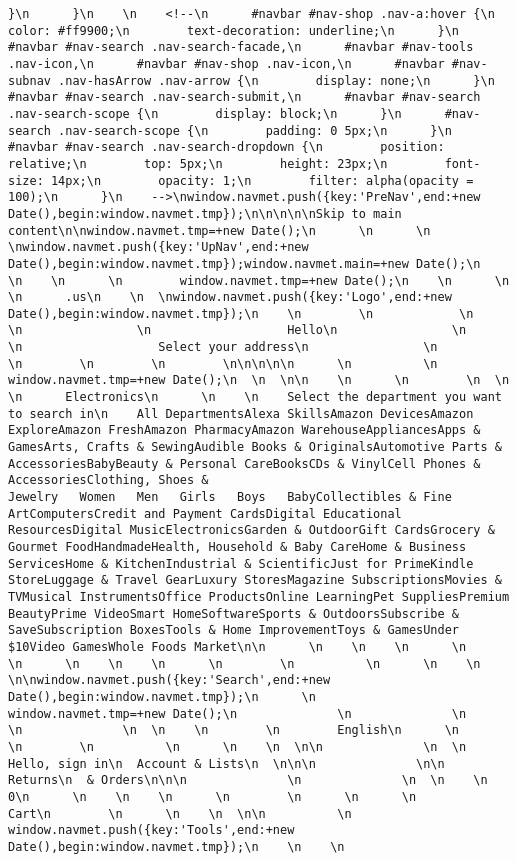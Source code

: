 \documentclass[
]{article}
\begin{document}
\begin{verbatim}
}\n      }\n    \n    <!--\n      #navbar #nav-shop .nav-a:hover {\n        color: #ff9900;\n        text-decoration: underline;\n      }\n      #navbar #nav-search .nav-search-facade,\n      #navbar #nav-tools .nav-icon,\n      #navbar #nav-shop .nav-icon,\n      #navbar #nav-subnav .nav-hasArrow .nav-arrow {\n        display: none;\n      }\n      #navbar #nav-search .nav-search-submit,\n      #navbar #nav-search .nav-search-scope {\n        display: block;\n      }\n      #nav-search .nav-search-scope {\n        padding: 0 5px;\n      }\n      #navbar #nav-search .nav-search-dropdown {\n        position: relative;\n        top: 5px;\n        height: 23px;\n        font-size: 14px;\n        opacity: 1;\n        filter: alpha(opacity = 100);\n      }\n    -->\nwindow.navmet.push({key:'PreNav',end:+new Date(),begin:window.navmet.tmp});\n\n\n\n\nSkip to main content\n\nwindow.navmet.tmp=+new Date();\n      \n      \n    \nwindow.navmet.push({key:'UpNav',end:+new Date(),begin:window.navmet.tmp});window.navmet.main=+new Date();\n    \n    \n      \n        window.navmet.tmp=+new Date();\n    \n      \n      \n      .us\n    \n  \nwindow.navmet.push({key:'Logo',end:+new Date(),begin:window.navmet.tmp});\n    \n        \n            \n            \n                \n                   Hello\n                \n                \n                   Select your address\n                \n            \n        \n        \n        \n\n\n\n\n      \n          \n            window.navmet.tmp=+new Date();\n  \n  \n\n    \n      \n        \n  \n    \n      Electronics\n      \n    \n    Select the department you want to search in\n    All DepartmentsAlexa SkillsAmazon DevicesAmazon ExploreAmazon FreshAmazon PharmacyAmazon WarehouseAppliancesApps & GamesArts, Crafts & SewingAudible Books & OriginalsAutomotive Parts & AccessoriesBabyBeauty & Personal CareBooksCDs & VinylCell Phones & AccessoriesClothing, Shoes & Jewelry   Women   Men   Girls   Boys   BabyCollectibles & Fine ArtComputersCredit and Payment CardsDigital Educational ResourcesDigital MusicElectronicsGarden & OutdoorGift CardsGrocery & Gourmet FoodHandmadeHealth, Household & Baby CareHome & Business ServicesHome & KitchenIndustrial & ScientificJust for PrimeKindle StoreLuggage & Travel GearLuxury StoresMagazine SubscriptionsMovies & TVMusical InstrumentsOffice ProductsOnline LearningPet SuppliesPremium BeautyPrime VideoSmart HomeSoftwareSports & OutdoorsSubscribe & SaveSubscription BoxesTools & Home ImprovementToys & GamesUnder $10Video GamesWhole Foods Market\n\n      \n    \n    \n      \n        \n      \n    \n    \n      \n        \n          \n      \n    \n  \n\nwindow.navmet.push({key:'Search',end:+new Date(),begin:window.navmet.tmp});\n      \n          window.navmet.tmp=+new Date();\n              \n              \n              \n              \n  \n    \n        \n        English\n      \n      \n        \n          \n      \n    \n  \n\n              \n  \n  Hello, sign in\n  Account & Lists\n  \n\n\n              \n\n  Returns\n  & Orders\n\n\n              \n              \n  \n    \n      0\n      \n    \n    \n      \n        \n      \n      \n        Cart\n        \n      \n    \n  \n\n          \n          window.navmet.push({key:'Tools',end:+new Date(),begin:window.navmet.tmp});\n    \n    \n   
\end{verbatim}
\end{document}
